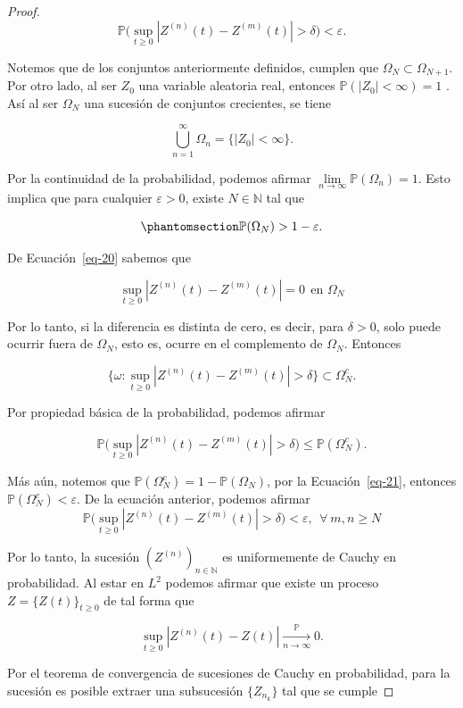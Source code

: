 \documentclass[
  spanish,
  us-letterpaper,
]{scrreprt}
\theoremstyle{plain}
\theoremstyle{plain}
\theoremstyle{plain}
\theoremstyle{definition}
\theoremstyle{remark}
\begin{document}
\begin{proof}
\[
    \mathbb{P}\Bigg(\sup\limits_{t\geq 0}|Z^{(n)}(t)-Z^{(m)}(t)|>\delta\Bigg)<\varepsilon.
\]

Notemos que de los conjuntos anteriormente definidos, cumplen que
\(\Omega_N\subset \Omega_{N+1}\). Por otro lado, al ser \(Z_0\) una
variable aleatoria real, entonces \(\mathbb{P}(|Z_0|<\infty)=1\) . Así
al ser \(\Omega_N\) una sucesión de conjuntos crecientes, se tiene

\[
    \bigcup\limits_{n=1}^{\infty}\Omega_n=\{|Z_0|<\infty\}.
\]

Por la continuidad de la probabilidad, podemos afirmar
\(\displaystyle \lim\limits_{n\rightarrow \infty}\mathbb{P}(\Omega_n)=1\).
Esto implica que para cualquier \(\varepsilon>0\), existe
\(N\in \mathbb{N}\) tal que

\begin{equation}\phantomsection\label{eq-21}{
    \mathbb{P}(\Omega_N)>1-\varepsilon.
}\end{equation}

De Ecuación~\ref{eq-20} sabemos que

\[
\sup\limits_{t\geq 0}|Z^{(n)}(t)-Z^{(m)}(t)|=0\ \ \text{en $\Omega_N$}
\]

Por lo tanto, si la diferencia es distinta de cero, es decir, para
\(\delta>0\), solo puede ocurrir fuera de \(\Omega_N\), esto es, ocurre
en el complemento de \(\Omega_N\). Entonces

\[
\Bigg\{\omega:\sup\limits_{t\geq 0}|Z^{(n)}(t)-Z^{(m)}(t)|>\delta\Bigg\}\subset \Omega_N^{c}.
\]

Por propiedad básica de la probabilidad, podemos afirmar

\[
\mathbb{P}\Bigg(\sup\limits_{t\geq 0}|Z^{(n)}(t)-Z^{(m)}(t)|>\delta\Bigg)\leq\mathbb{P}(\Omega_N^c).
\]

Más aún, notemos que \(\mathbb{P}(\Omega_N^c)=1-\mathbb{P}(\Omega_N)\),
por la Ecuación~\ref{eq-21}, entonces
\(\mathbb{P}(\Omega_N^c)<\varepsilon\). De la ecuación anterior, podemos
afirmar \[
    \mathbb{P}\Bigg(\sup\limits_{t\geq 0}|Z^{(n)}(t)-Z^{(m)}(t)|>\delta\Bigg)<\varepsilon, \ \ \forall\ m,n\geq N
\]

Por lo tanto, la sucesión \((Z^{(n)})_{n\in \mathbb{N}}\) es
uniformemente de Cauchy en probabilidad. Al estar en \(L^2\) podemos
afirmar que existe un proceso \(Z=\{Z(t)\}_{t\geq 0}\) de tal forma que

\[
    \sup\limits_{t\geq 0}|Z^{(n)}(t)-Z(t)| \xrightarrow[n \to \infty]{\mathbb{P}} 0.
\]

Por el teorema de convergencia de sucesiones de Cauchy en probabilidad,
para la sucesión es posible extraer una subsucesión \(\{Z_{n_k}\}\) tal
que se cumple


\end{proof}
\end{document}
